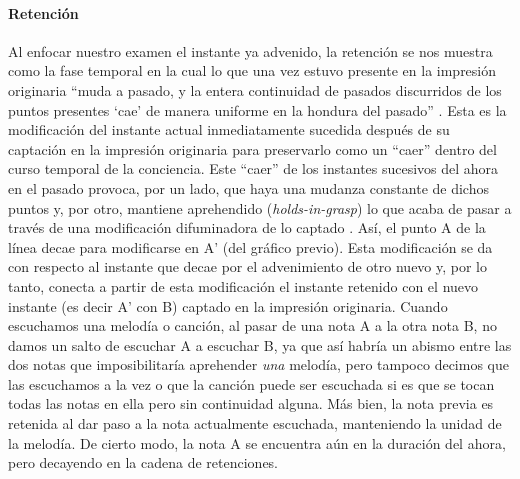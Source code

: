 \paragraph{Retención}

Al enfocar nuestro examen el instante ya advenido, la retención se nos
muestra como la fase temporal en la cual lo que una vez estuvo presente
en la impresión originaria ``muda a pasado, y la entera continuidad de
pasados discurridos de los puntos presentes `cae' de manera uniforme en
la hondura del pasado'' \cite[§10, p.~51]{husserl2002}. Esta es la modificación
del instante actual inmediatamente sucedida después de su captación en
la impresión originaria para preservarlo como un ``caer'' dentro del
curso temporal de la conciencia. Este ``caer'' de los instantes
sucesivos del ahora en el pasado provoca, por un lado, que haya una
mudanza constante de dichos puntos y, por otro, mantiene aprehendido
(\emph{holds-in-grasp}) lo que acaba de pasar a través de una
modificación difuminadora de lo captado \cite[p.~245]{kortooms2002}. Así, el
punto A de la línea decae para modificarse en A' (del gráfico previo).
Esta modificación se da con respecto al instante que decae por el
advenimiento de otro nuevo y, por lo tanto, conecta a partir de esta
modificación el instante retenido con el nuevo instante (es decir A' con
B) captado en la impresión originaria. Cuando escuchamos una melodía o
canción, al pasar de una nota A a la otra nota B, no damos un salto de
escuchar A a escuchar B, ya que así habría un abismo entre las dos notas
que imposibilitaría aprehender \emph{una} melodía, pero tampoco decimos
que las escuchamos a la vez o que la canción puede ser escuchada si es
que se tocan todas las notas en ella pero sin continuidad alguna. Más
bien, la nota previa es retenida al dar paso a la nota actualmente
escuchada, manteniendo la unidad de la melodía. De cierto modo, la nota
A se encuentra aún en la duración del ahora, pero decayendo en la cadena
de retenciones.

